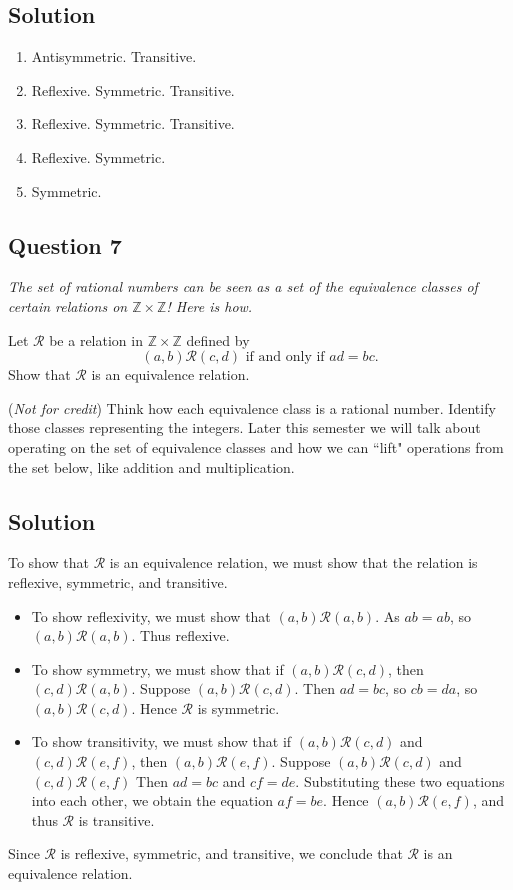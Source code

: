 \documentclass{article}
\begin{document}
\subsection*{Solution}
    \begin{enumerate}
        \item Antisymmetric. Transitive.
        \item Reflexive. Symmetric. Transitive.
        \item Reflexive. Symmetric. Transitive.
        \item Reflexive. Symmetric.
        \item Symmetric.
    \end{enumerate}

\subsection*{Question 7}
    \textit{The set of rational numbers can be seen as a set of the equivalence classes of certain relations on $\mathbb{Z} \times \mathbb{Z}$! Here is how.}
    
    \vspace{1.5mm}
    Let $\mathcal{R}$ be a relation in $\mathbb{Z} \times \mathbb{Z}$ defined by $$(a, b) \mathcal{R} (c, d) \text{ if and only if } ad = bc.$$ Show that $\mathcal{R}$ is an equivalence relation.

    \vspace{3mm} (\textit{Not for credit}) Think how each equivalence class is a rational number. Identify those classes representing the integers. Later this semester we will talk about operating on the set of equivalence classes and how we can ``lift" operations from the set below, like addition and multiplication.

\subsection*{Solution}
    To show that $\mathcal{R}$ is an equivalence relation, we must show that the relation is reflexive, symmetric, and transitive.
    \begin{itemize}
        \item To show reflexivity, we must show that $(a, b)\mathcal{R}(a, b)$. As $ab = ab$, so $(a, b)\mathcal{R}(a, b)$. Thus reflexive.
        \item To show symmetry, we must show that if $(a, b)\mathcal{R}(c, d)$, then $(c, d)\mathcal{R}(a, b)$. Suppose $(a, b)\mathcal{R}(c, d)$. Then $ad = bc$, so $cb = da$, so $(a, b)\mathcal{R}(c, d)$. Hence $\mathcal{R}$ is symmetric.
        \item To show transitivity, we must show that if $(a, b)\mathcal{R}(c, d)$ and $(c, d)\mathcal{R}(e, f)$, then $(a, b)\mathcal{R}(e, f)$. Suppose $(a, b)\mathcal{R}(c, d)$ and $(c, d)\mathcal{R}(e, f)$ Then $ad = bc$ and $cf = de$. Substituting these two equations into each other, we obtain the equation $af = be$. Hence $(a, b)\mathcal{R}(e, f)$, and thus $\mathcal{R}$ is transitive.
    \end{itemize}
    Since $\mathcal{R}$ is reflexive, symmetric, and transitive, we conclude that $\mathcal{R}$ is an equivalence relation.
\end{document}
